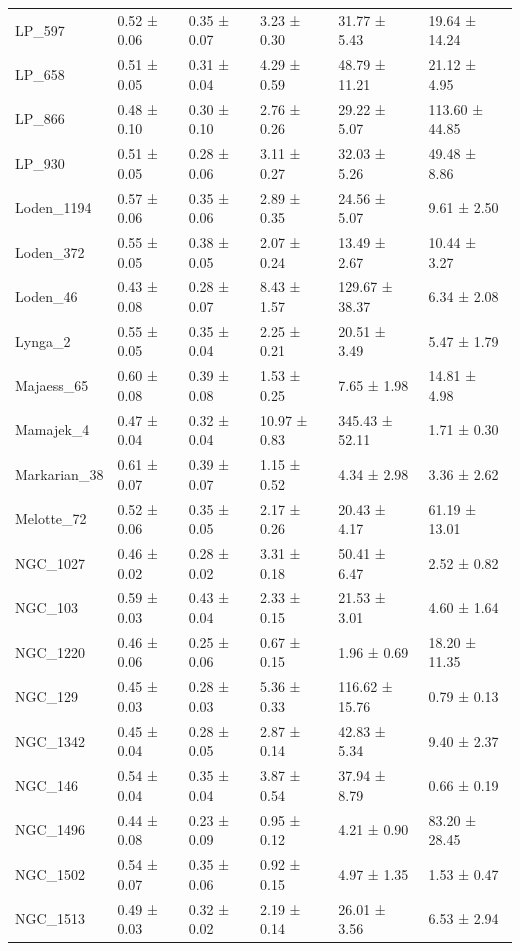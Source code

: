 \begin{tabular}{llllll}
LP_597 & 0.52 ± 0.06 & 0.35 ± 0.07 & 3.23 ± 0.30 & 31.77 ± 5.43 & 19.64 ± 14.24 \\
LP_658 & 0.51 ± 0.05 & 0.31 ± 0.04 & 4.29 ± 0.59 & 48.79 ± 11.21 & 21.12 ± 4.95 \\
LP_866 & 0.48 ± 0.10 & 0.30 ± 0.10 & 2.76 ± 0.26 & 29.22 ± 5.07 & 113.60 ± 44.85 \\
LP_930 & 0.51 ± 0.05 & 0.28 ± 0.06 & 3.11 ± 0.27 & 32.03 ± 5.26 & 49.48 ± 8.86 \\
Loden_1194 & 0.57 ± 0.06 & 0.35 ± 0.06 & 2.89 ± 0.35 & 24.56 ± 5.07 & 9.61 ± 2.50 \\
Loden_372 & 0.55 ± 0.05 & 0.38 ± 0.05 & 2.07 ± 0.24 & 13.49 ± 2.67 & 10.44 ± 3.27 \\
Loden_46 & 0.43 ± 0.08 & 0.28 ± 0.07 & 8.43 ± 1.57 & 129.67 ± 38.37 & 6.34 ± 2.08 \\
Lynga_2 & 0.55 ± 0.05 & 0.35 ± 0.04 & 2.25 ± 0.21 & 20.51 ± 3.49 & 5.47 ± 1.79 \\
Majaess_65 & 0.60 ± 0.08 & 0.39 ± 0.08 & 1.53 ± 0.25 & 7.65 ± 1.98 & 14.81 ± 4.98 \\
Mamajek_4 & 0.47 ± 0.04 & 0.32 ± 0.04 & 10.97 ± 0.83 & 345.43 ± 52.11 & 1.71 ± 0.30 \\
Markarian_38 & 0.61 ± 0.07 & 0.39 ± 0.07 & 1.15 ± 0.52 & 4.34 ± 2.98 & 3.36 ± 2.62 \\
Melotte_72 & 0.52 ± 0.06 & 0.35 ± 0.05 & 2.17 ± 0.26 & 20.43 ± 4.17 & 61.19 ± 13.01 \\
NGC_1027 & 0.46 ± 0.02 & 0.28 ± 0.02 & 3.31 ± 0.18 & 50.41 ± 6.47 & 2.52 ± 0.82 \\
NGC_103 & 0.59 ± 0.03 & 0.43 ± 0.04 & 2.33 ± 0.15 & 21.53 ± 3.01 & 4.60 ± 1.64 \\
NGC_1220 & 0.46 ± 0.06 & 0.25 ± 0.06 & 0.67 ± 0.15 & 1.96 ± 0.69 & 18.20 ± 11.35 \\
NGC_129 & 0.45 ± 0.03 & 0.28 ± 0.03 & 5.36 ± 0.33 & 116.62 ± 15.76 & 0.79 ± 0.13 \\
NGC_1342 & 0.45 ± 0.04 & 0.28 ± 0.05 & 2.87 ± 0.14 & 42.83 ± 5.34 & 9.40 ± 2.37 \\
NGC_146 & 0.54 ± 0.04 & 0.35 ± 0.04 & 3.87 ± 0.54 & 37.94 ± 8.79 & 0.66 ± 0.19 \\
NGC_1496 & 0.44 ± 0.08 & 0.23 ± 0.09 & 0.95 ± 0.12 & 4.21 ± 0.90 & 83.20 ± 28.45 \\
NGC_1502 & 0.54 ± 0.07 & 0.35 ± 0.06 & 0.92 ± 0.15 & 4.97 ± 1.35 & 1.53 ± 0.47 \\
NGC_1513 & 0.49 ± 0.03 & 0.32 ± 0.02 & 2.19 ± 0.14 & 26.01 ± 3.56 & 6.53 ± 2.94 \\

\end{tabular}
